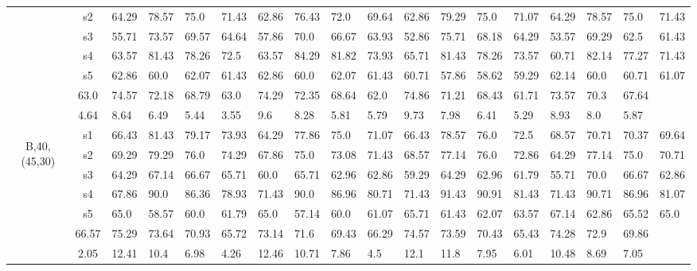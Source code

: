 \begin{table}[h]
{\begin{tabular}{cc|llll|llll|llll|llll}
 & s2 & 64.29 & 78.57 & 75.0 & 71.43 & 62.86 & 76.43 & 72.0 & 69.64 & 62.86 & 79.29 & 75.0 & 71.07 & 64.29 & 78.57 & 75.0 & 71.43 \\
 & s3 & 55.71 & 73.57 & 69.57 & 64.64 & 57.86 & 70.0 & 66.67 & 63.93 & 52.86 & 75.71 & 68.18 & 64.29 & 53.57 & 69.29 & 62.5 & 61.43 \\
 & s4 & 63.57 & 81.43 & 78.26 & 72.5 & 63.57 & 84.29 & 81.82 & 73.93 & 65.71 & 81.43 & 78.26 & 73.57 & 60.71 & 82.14 & 77.27 & 71.43 \\
 & s5 & 62.86 & 60.0 & 62.07 & 61.43 & 62.86 & 60.0 & 62.07 & 61.43 & 60.71 & 57.86 & 58.62 & 59.29 & 62.14 & 60.0 & 60.71 & 61.07 \\
\rowcolor{lightgray!50}\multicolumn{2}{r|}{avg} & 63.0 & 74.57 & 72.18 & 68.79 & 63.0 & 74.29 & 72.35 & 68.64 & 62.0 & 74.86 & 71.21 & 68.43 & 61.71 & 73.57 & 70.3 & 67.64 \\
\rowcolor{lightgray!50}\multicolumn{2}{r|}{std} & 4.64 & 8.64 & 6.49 & 5.44 & 3.55 & 9.6 & 8.28 & 5.81 & 5.79 & 9.73 & 7.98 & 6.41 & 5.29 & 8.93 & 8.0 & 5.87 \\
\multirow{6}{*}{\begin{sideways}B,40,(45,30)\end{sideways}} & s1 & 66.43 & 81.43 & 79.17 & 73.93 & 64.29 & 77.86 & 75.0 & 71.07 & 66.43 & 78.57 & 76.0 & 72.5 & 68.57 & 70.71 & 70.37 & 69.64 \\
 & s2 & 69.29 & 79.29 & 76.0 & 74.29 & 67.86 & 75.0 & 73.08 & 71.43 & 68.57 & 77.14 & 76.0 & 72.86 & 64.29 & 77.14 & 75.0 & 70.71 \\
 & s3 & 64.29 & 67.14 & 66.67 & 65.71 & 60.0 & 65.71 & 62.96 & 62.86 & 59.29 & 64.29 & 62.96 & 61.79 & 55.71 & 70.0 & 66.67 & 62.86 \\
 & s4 & 67.86 & 90.0 & 86.36 & 78.93 & 71.43 & 90.0 & 86.96 & 80.71 & 71.43 & 91.43 & 90.91 & 81.43 & 71.43 & 90.71 & 86.96 & 81.07 \\
 & s5 & 65.0 & 58.57 & 60.0 & 61.79 & 65.0 & 57.14 & 60.0 & 61.07 & 65.71 & 61.43 & 62.07 & 63.57 & 67.14 & 62.86 & 65.52 & 65.0 \\
\rowcolor{lightgray!50}\multicolumn{2}{r|}{avg} & 66.57 & 75.29 & 73.64 & 70.93 & 65.72 & 73.14 & 71.6 & 69.43 & 66.29 & 74.57 & 73.59 & 70.43 & 65.43 & 74.28 & 72.9 & 69.86 \\
\rowcolor{lightgray!50}\multicolumn{2}{r|}{std} & 2.05 & 12.41 & 10.4 & 6.98 & 4.26 & 12.46 & 10.71 & 7.86 & 4.5 & 12.1 & 11.8 & 7.95 & 6.01 & 10.48 & 8.69 & 7.05
\end{tabular}}
\end{table}

